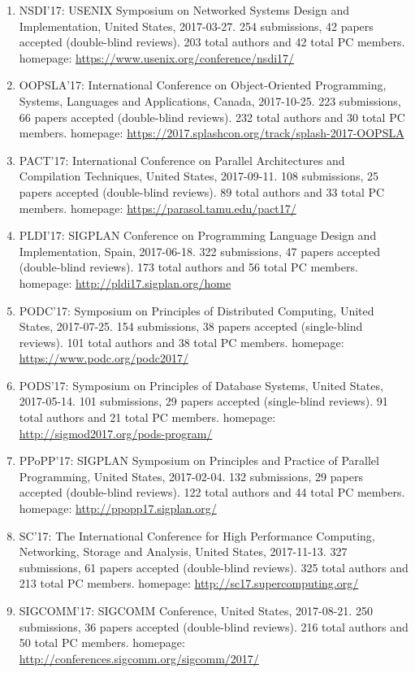 \documentclass[10pt,letterpaper]{article}
\begin{document}
\begin{enumerate}
\item NSDI'17: USENIX Symposium on Networked Systems Design and Implementation, United States, 2017-03-27. 254  submissions, 42 papers accepted (double-blind reviews). 203 total authors and 42 total PC members. homepage: \url{https://www.usenix.org/conference/nsdi17/}
\item OOPSLA'17: International Conference on Object-Oriented Programming, Systems, Languages and Applications, Canada, 2017-10-25. 223  submissions, 66 papers accepted (double-blind reviews). 232 total authors and 30 total PC members. homepage: \url{https://2017.splashcon.org/track/splash-2017-OOPSLA}
\item PACT'17: International Conference on Parallel Architectures and Compilation Techniques, United States, 2017-09-11. 108  submissions, 25 papers accepted (double-blind reviews). 89 total authors and 33 total PC members. homepage: \url{https://parasol.tamu.edu/pact17/}
\item PLDI'17: SIGPLAN Conference on Programming Language Design and Implementation, Spain, 2017-06-18. 322  submissions, 47 papers accepted (double-blind reviews). 173 total authors and 56 total PC members. homepage: \url{http://pldi17.sigplan.org/home}
\item PODC'17: Symposium on Principles of Distributed Computing, United States, 2017-07-25. 154  submissions, 38 papers accepted (single-blind reviews). 101 total authors and 38 total PC members. homepage: \url{https://www.podc.org/podc2017/}
\item PODS'17: Symposium on Principles of Database Systems, United States, 2017-05-14. 101  submissions, 29 papers accepted (single-blind reviews). 91 total authors and 21 total PC members. homepage: \url{http://sigmod2017.org/pods-program/}
\item PPoPP'17: SIGPLAN Symposium on Principles and Practice of Parallel Programming, United States, 2017-02-04. 132  submissions, 29 papers accepted (double-blind reviews). 122 total authors and 44 total PC members. homepage: \url{http://ppopp17.sigplan.org/}
\item SC'17: The International Conference for High Performance Computing, Networking, Storage and Analysis, United States, 2017-11-13. 327  submissions, 61 papers accepted (double-blind reviews). 325 total authors and 213 total PC members. homepage: \url{http://sc17.supercomputing.org/}
\item SIGCOMM'17: SIGCOMM Conference, United States, 2017-08-21. 250  submissions, 36 papers accepted (double-blind reviews). 216 total authors and 50 total PC members. homepage: \url{http://conferences.sigcomm.org/sigcomm/2017/}

\end{enumerate}
\end{document}
